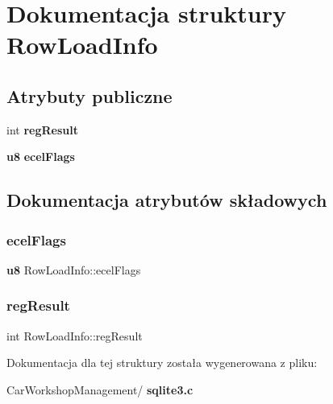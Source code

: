 \section{Dokumentacja struktury Row\+Load\+Info}
\label{struct_row_load_info}
\subsection*{Atrybuty publiczne}
\begin{DoxyCompactItemize}
\item 
int \textbf{ reg\+Result}
\item 
\textbf{ u8} \textbf{ ecel\+Flags}
\end{DoxyCompactItemize}


\subsection{Dokumentacja atrybutów składowych}
\mbox{\label{struct_row_load_info_a0898f16fe8c201b2626bfe4fb3c3272b}} 
\subsubsection{ecelFlags}
{\footnotesize\ttfamily \textbf{ u8} Row\+Load\+Info\+::ecel\+Flags}

\mbox{\label{struct_row_load_info_a64cdc4c4355a849f296e9c3419a249ea}} 
\subsubsection{regResult}
{\footnotesize\ttfamily int Row\+Load\+Info\+::reg\+Result}



Dokumentacja dla tej struktury została wygenerowana z pliku\+:\begin{DoxyCompactItemize}
\item 
Car\+Workshop\+Management/\textbf{ sqlite3.\+c}\end{DoxyCompactItemize}
